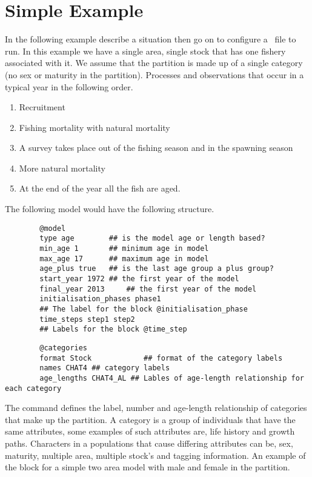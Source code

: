 \section{Simple Example}\label{Sec:simp}
In the following example describe a situation then go on to configure a \CNAME\ file to run. In this example we have a single area, single stock that has one fishery associated with it. We assume that the partition is made up of a single category (no sex or maturity in the partition). Processes and observations that occur in a typical year in the following order. \\
\begin{enumerate}
	\item Recruitment
	\item Fishing mortality with natural mortality
	\item A survey takes place out of the fishing season and in the spawning season
	\item More natural mortality
	\item At the end of the year all the fish are aged.
\end{enumerate}

The following model would have the following structure.

{\small{\begin{verbatim}
		@model
		type age		## is the model age or length based?
		min_age 1		## minimum age in model
		max_age 17		## maximum age in model
		age_plus true	## is the last age group a plus group?
		start_year 1972	## the first year of the model
		final_year 2013 	## the first year of the model
		initialisation_phases phase1	
		## The label for the block @initialisation_phase
		time_steps step1 step2
		## Labels for the block @time_step
		\end{verbatim}}}



{\small{\begin{verbatim}
		@categories
		format Stock			## format of the category labels
		names CHAT4 ## category labels
		age_lengths CHAT4_AL ## Lables of age-length relationship for each category
		\end{verbatim}}}


The  command defines the label, number and age-length relationship of categories that make up the partition. A category is a group of individuals that have the same attributes, some examples of such attributes are, life history and growth paths. Characters in a populations that cause differing attributes can be, sex, maturity, multiple area, multiple stock's and tagging information. An example of the  block for a simple two area model with male and female in the partition.


